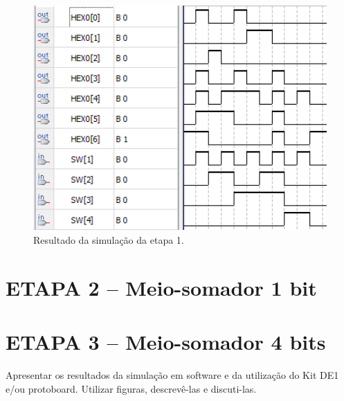 		\begin{figure}[H]
		    \centering
			\caption{\label{fig:etapa1Simulacao}Resultado da simulação da etapa 1.}
			\includegraphics[width=1\textwidth]{img/SimulacaoSegmentos7}
		\end{figure}


	\section{ETAPA 2 – Meio-somador 1 bit}

	\section{ETAPA 3 – Meio-somador 4 bits}


Apresentar os resultados da simulação em software e da utilização do Kit DE1 e/ou
protoboard. Utilizar figuras, descrevê-las e discuti-las.
